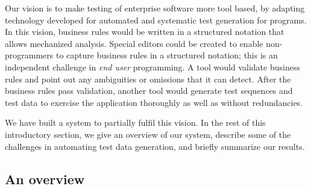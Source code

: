 Our vision is to make testing of enterprise software more tool based, by adapting technology developed 
for automated and systematic test generation for programs.   In this vision, business rules would be 
written in a structured notation that allows mechanized analysis. 
Special editors could be created to enable non-programmers to capture business rules in a structured notation; 
this is an independent challenge in \textit{end user} programming.  A tool would validate business rules 
and point out any ambiguities or omissions that it can detect.  After the business rules pass validation, 
another tool would generate test sequences and test data to exercise the application thoroughly as well as
without redundancies.

We have built a system to partially fulfil this vision.  In the rest of this introductory section, we
give an overview of our system, describe some of the challenges in automating test data generation, and 
briefly summarize our results.


\subsection{An overview}

